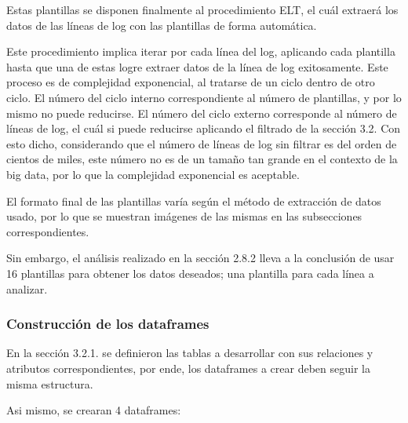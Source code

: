 Estas plantillas se disponen finalmente al procedimiento ELT, el cuál extraerá los datos de las líneas de log con las plantillas de forma automática.

Este procedimiento implica iterar por cada línea del log, aplicando cada plantilla hasta que una de estas logre extraer datos de la línea de log exitosamente. Este proceso es de complejidad exponencial, al tratarse de un ciclo dentro de otro ciclo. El número del ciclo interno correspondiente al número de plantillas, y por lo mismo no puede reducirse. El número del ciclo externo corresponde al número de líneas de log, el cuál si puede reducirse aplicando el filtrado de la sección 3.2. Con esto dicho, considerando que el número de líneas de log sin filtrar es del orden de cientos de miles, este número no es de un tamaño tan grande en el contexto de la big data, por lo que la complejidad exponencial es aceptable.

El formato final de las plantillas varía según el método de extracción de datos usado, por lo que se muestran imágenes de las mismas en las subsecciones correspondientes.

Sin embargo, el análisis realizado en la sección 2.8.2 lleva a la conclusión de usar 16 plantillas para obtener los datos deseados; una plantilla para cada línea a analizar.

\subsubsection{Construcción de los dataframes}

En la sección 3.2.1. se definieron las tablas a desarrollar con sus relaciones y atributos correspondientes, por ende, los dataframes a crear deben seguir la misma estructura.

Asi mismo, se crearan 4 dataframes:

